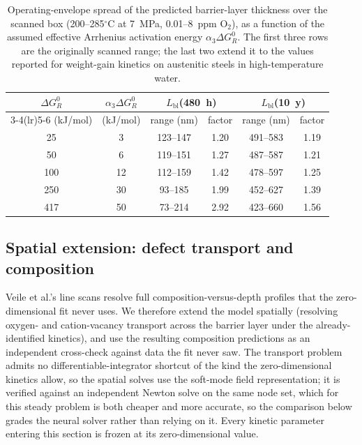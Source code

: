 \documentclass[a4paper,fleqn]{cas-sc}
\begin{document}
\begin{table}[htbp]
\centering
\caption{Operating-envelope spread of the predicted barrier-layer
thickness over the scanned box (200--285$^\circ$C at 7~MPa, 0.01--8~ppm
O$_2$), as a function of the assumed effective Arrhenius activation
energy $\alpha_3\Delta G^0_R$. The first three rows are the
originally scanned range; the last two extend it to the values reported
for weight-gain kinetics on austenitic steels in high-temperature water.}
\label{tab:envelope}
\small
\begin{tabular}{cccccc}
\toprule
$\Delta G^0_R$ & $\alpha_3\Delta G^0_R$ & \multicolumn{2}{c}{$L_\text{bl}$(480~h)} & \multicolumn{2}{c}{$L_\text{bl}$(10~y)} \\
\cmidrule(lr){3-4}\cmidrule(lr){5-6}
(kJ/mol) & (kJ/mol) & range (nm) & factor & range (nm) & factor \\
\midrule
25 & 3 & 123--147 & 1.20 & 491--583 & 1.19 \\
50 & 6 & 119--151 & 1.27 & 487--587 & 1.21 \\
100 & 12 & 112--159 & 1.42 & 478--597 & 1.25 \\
250 & 30 & 93--185 & 1.99 & 452--627 & 1.39 \\
417 & 50 & 73--214 & 2.92 & 423--660 & 1.56 \\
\bottomrule
\end{tabular}
\end{table}

\subsection{Spatial extension: defect transport and composition}\label{sec:spatial}

Veile et al.'s line scans resolve full composition-versus-depth
profiles that the zero-dimensional fit never uses. We therefore extend
the model spatially (resolving oxygen- and cation-vacancy transport
across the barrier layer under the already-identified kinetics), and
use the resulting composition predictions as an independent cross-check
against data the fit never saw. The transport problem admits no
differentiable-integrator shortcut of the kind the zero-dimensional
kinetics allow, so the spatial solves use the soft-mode field
representation; it is verified against an independent Newton solve on
the same node set, which for this steady problem is both cheaper and
more accurate, so the comparison below grades the neural solver rather
than relying on it. Every kinetic parameter entering this section is
frozen at its zero-dimensional value.
\end{document}
